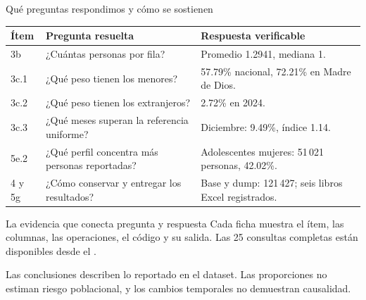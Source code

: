 \begin{frame}[label=cierre]{Qué preguntas respondimos y cómo se sostienen}
  \small
  \begin{tabularx}{\linewidth}{@{}lXX@{}}
    \toprule
    \textbf{Ítem} & \textbf{Pregunta resuelta} & \textbf{Respuesta verificable}\\
    \midrule
    3b & ¿Cuántas personas por fila? & Promedio 1.2941, mediana 1.\\
    3c.1 & ¿Qué peso tienen los menores? & 57.79\% nacional, 72.21\% en Madre de Dios.\\
    3c.2 & ¿Qué peso tienen los extranjeros? & 2.72\% en 2024.\\
    3c.3 & ¿Qué meses superan la referencia uniforme? & Diciembre: 9.49\%, índice 1.14.\\
    5e.2 & ¿Qué perfil concentra más personas reportadas? & Adolescentes mujeres: 51\,021 personas, 42.02\%.\\
    4 y 5g & ¿Cómo conservar y entregar los resultados? & Base y dump: 121\,427; seis libros Excel registrados.\\
    \bottomrule
  \end{tabularx}
  \begin{block}{La evidencia que conecta pregunta y respuesta}
    \footnotesize Cada ficha muestra el ítem, las columnas, las operaciones, el código y su salida.
    Las 25 consultas completas están disponibles desde el .
  \end{block}
  \footnotesize
  Las conclusiones describen lo reportado en el dataset. Las proporciones no estiman
  riesgo poblacional, y los cambios temporales no demuestran causalidad.
\end{frame}
